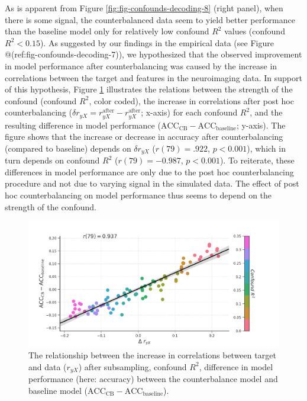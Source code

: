 \documentclass[11pt,american,a4paper,oneside,]{memoir} %
\begin{document}
As is apparent from Figure \ref{fig:fig-confounds-decoding-8} (right panel), when there is some signal, the counterbalanced data seem to yield better performance than the baseline model only for relatively low confound \(R^2\) values (confound \(R^2 < 0.15\)). As suggested by our findings in the empirical data (see Figure @(ref:fig-confounds-decoding-7)), we hypothesized that the observed improvement in model performance after counterbalancing was caused by the increase in correlations between the target and features in the neuroimaging data. In support of this hypothesis, Figure \ref{fig:fig-confounds-decoding-9} illustrates the relations between the strength of the confound (confound \(R^2\), color coded), the increase in correlations after post hoc counterbalancing (\(\delta r_{yX} = r_{yX}^{\mathrm{after}} - r_{yX}^{\mathrm{after}}\); x-axis) for each confound \(R^2\), and the resulting difference in model performance (\(\mathrm{ACC}_{\mathrm{CB}} - \mathrm{ACC}_{\mathrm{baseline}}\); y-axis). The figure shows that the increase or decrease in accuracy after counterbalancing (compared to baseline) depends on \(\delta r_{yX}\) (\(r(79) = .922\), \(p < 0.001\)), which in turn depends on confound \(R^2\) (\(r(79) = -0.987\), \(p < 0.001\)). To reiterate, these differences in model performance are only due to the post hoc counterbalancing procedure and not due to varying signal in the simulated data. The effect of post hoc counterbalancing on model performance thus seems to depend on the strength of the confound.

\begin{figure}
\centering
\includegraphics{_bookdown_files/confounds-decoding-files/figures/figure_9.pdf}
\caption{\label{fig:fig-confounds-decoding-9}The relationship between the increase in correlations between target and data (\(r_{yX}\)) after subsampling, confound \(R^2\), difference in model performance (here: accuracy) between the counterbalance model and baseline model (\(\mathrm{ACC}_{\mathrm{CB}} - \mathrm{ACC}_{\mathrm{baseline}}\)).}
\end{figure}
\end{document}
